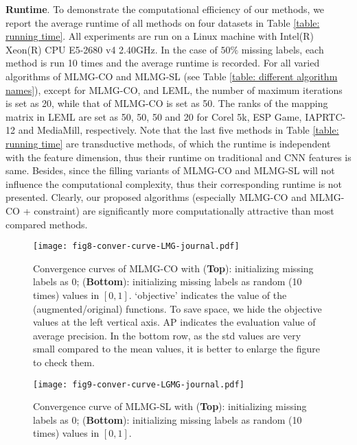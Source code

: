 \documentclass[twocolumn]{svjour3}          %
\begin{document}
\vspace{1pt}\noindent
{\bf Runtime}.
To demonstrate the computational efficiency of our methods, we report the average runtime of all methods on four datasets in Table \ref{table: running time}. 
All experiments are run on a Linux machine with Intel(R) Xeon(R) CPU E5-2680 v4 2.40GHz. 
In the case of $50\%$ missing labels, each method is run 10 times and the average runtime is recorded.
For all varied algorithms of MLMG-CO and MLMG-SL (see Table \ref{table: different algorithm names}), except for MLMG-CO, and LEML, the number of maximum iterations is set as 20, while that of MLMG-CO is set as 50. 
The ranks of the mapping matrix in LEML are set as 50, 50, 50 and 20 for Corel 5k, ESP Game, IAPRTC-12 and MediaMill, respectively. 
Note that the last five methods in Table \ref{table: running time} are transductive methods, of which the runtime is independent with the feature dimension, thus their runtime on traditional and CNN features is same. 
Besides, since the filling variants of MLMG-CO and MLMG-SL will not influence the computational complexity, thus their corresponding runtime is not presented. 
Clearly, our proposed algorithms (especially MLMG-CO and MLMG-CO + constraint) are significantly more computationally attractive than most compared methods.



\begin{figure*}[hptb]
\centering
\texttt{[image: fig8-conver-curve-LMG-journal.pdf]}
\caption{Convergence curves of MLMG-CO with (\textbf{Top}): initializing missing labels as 0; (\textbf{Bottom}): initializing missing labels as random (10 times) values in $[0,1]$.
`objective' indicates the value of the (augmented/original) functions. To save space, we hide the objective values at the left vertical axis. 
%
AP indicates the evaluation value of average precision.
In the bottom row, as the std values are very small compared to the mean values, it is better to enlarge the figure to check them. }
\label{fig: Convergence curve random initialization of MLMG-CO}
\end{figure*}

\begin{figure*}[hptb]
\centering
\texttt{[image: fig9-conver-curve-LGMG-journal.pdf]}
\caption{Convergence curve of MLMG-SL with (\textbf{Top}): initializing missing labels as 0; (\textbf{Bottom}): initializing missing labels as random (10 times) values in $[0,1]$.}
\label{fig: Convergence curve random initialization of MLMG-SL}
\end{figure*}
\end{document}
